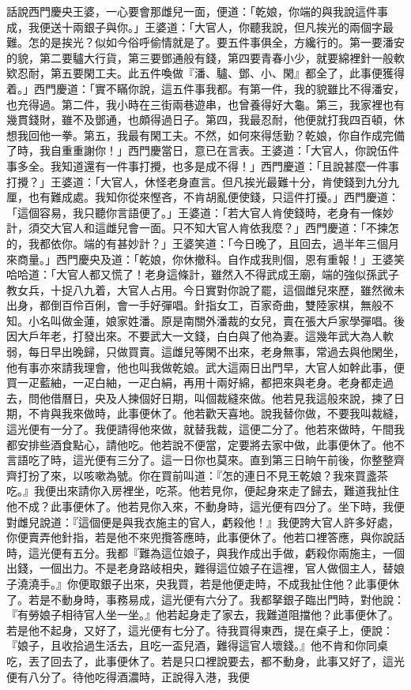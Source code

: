 \begin{showcontents}{}
話說西門慶央王婆，一心要會那雌兒一面，便道：「乾娘，你端的與我說這件事成，我便送十兩銀子與你。」王婆道：「大官人，你聽我說，但凡挨光的兩個字最難。怎的是挨光？似如今俗呼偷情就是了。要五件事俱全，方纔行的。第一要潘安的貌，第二要驢大行貨，第三要鄧通般有錢，第四要青春小少，就要綿裡針一般軟欵忍耐，第五要閑工夫。此五件喚做『潘、驢、鄧、小、閑』都全了，此事便獲得着。」西門慶道：「實不瞞你說，這五件事我都。有第一件，我的貌雖比不得潘安，也充得過。第二件，我小時在三街兩巷遊串，也曾養得好大龜。第三，我家裡也有幾貫錢財，雖不及鄧通，也頗得過日子。第四，我最忍耐，他便就打我四百頓，休想我回他一拳。第五，我最有閑工夫。不然，如何來得恁勤？乾娘，你自作成完備了時，我自重重謝你！」西門慶當日，意已在言表。王婆道：「大官人，你說伍件事多全。我知道還有一件事打攪，也多是成不得！」西門慶道：「且說甚麼一件事打攪？」王婆道：「大官人，休怪老身直言。但凡挨光最難十分，肯使錢到九分九厘，也有難成處。我知你從來慳吝，不肯胡亂便使錢，只這件打擾。」西門慶道：「這個容易，我只聽你言語便了。」王婆道：「若大官人肯使錢時，老身有一條妙計，須交大官人和這雌兒會一面。只不知大官人肯依我麼？」西門慶道：「不揀怎的，我都依你。端的有甚妙計？」王婆笑道：「今日晚了，且回去，過半年三個月來商量。」西門慶央及道：「乾娘，你休撤科。自作成我則個，恩有重報！」王婆笑哈哈道：「大官人都又慌了！老身這條計，雖然入不得武成王廟，端的強似孫武子教女兵，十捉八九着，大官人占用。今日實對你說了罷，這個雌兒來歷，雖然微未出身，都倒百伶百俐，會一手好彈唱。針指女工，百家奇曲，雙陸家棋，無般不知。小名叫做金蓮，娘家姓潘。原是南關外潘裁的女兒，賣在張大戶家學彈唱。後因大戶年老，打發出來。不要武大一文錢，白白與了他為妻。這幾年武大為人軟弱，每日早出晚歸，只做買賣。這雌兒等閑不出來，老身無事，常過去與他閑坐，他有事亦來請我理會，他也叫我做乾娘。武大這兩日出門早，大官人如幹此事，便買一疋藍紬，一疋白紬，一疋白絹，再用十兩好綿，都把來與老身。老身都走過去，問他借曆日，央及人揀個好日期，叫個裁縫來做。他若見我這般來說，揀了日期，不肯與我來做時，此事便休了。他若歡天喜地。說我替你做，不要我叫裁縫，這光便有一分了。我便請得他來做，就替我裁，這便二分了。他若來做時，午間我都安排些酒食點心，請他吃。他若說不便當，定要將去家中做，此事便休了。他不言語吃了時，這光便有三分了。這一日你也莫來。直到第三日晌午前後，你整整齊齊打扮了來，以咳嗽為號。你在買前叫道：『怎的連日不見王乾娘？我來買盞茶吃。』我便出來請你入房裡坐，吃茶。他若見你，便起身來走了歸去，難道我扯住他不成？此事便休了。他若見你入來，不動身時，這光便有四分了。坐下時，我便對雌兒說道：『這個便是與我衣施主的官人，虧殺他！』我便誇大官人許多好處，你便賣弄他針指，若是他不來兜攬答應時，此事便休了。他若口裡答應，與你說話時，這光便有五分。我都『難為這位娘子，與我作成出手做，虧殺你兩施主，一個出錢，一個出力。不是老身路岐相央，難得這位娘子在這裡，官人做個主人，替娘子澆澆手。』你便取銀子出來，央我買，若是他便走時，不成我扯住他？此事便休了。若是不動身時，事務易成，這光便有六分了。我都拏銀子臨出門時，對他說：『有勞娘子相待官人坐一坐。』他若起身走了家去，我難道阻擋他？此事便休了。若是他不起身，又好了，這光便有七分了。待我買得東西，提在桌子上，便說：『娘子，且收拾過生活去，且吃一盃兒酒，難得這官人壞錢。』他不肯和你同桌吃，丟了回去了，此事便休了。若是只口裡說要去，都不動身，此事又好了，這光便有八分了。待他吃得酒濃時，正說得入港，我便
\end{showcontents}
